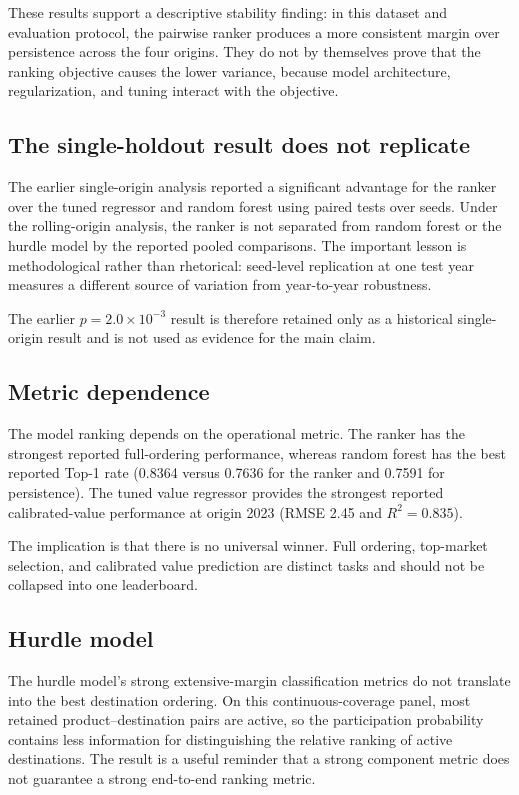 \documentclass[conference]{IEEEtran}
\begin{document}
These results support a descriptive stability finding: in this dataset and evaluation protocol, the pairwise ranker produces a more consistent margin over persistence across the four origins. They do not by themselves prove that the ranking objective causes the lower variance, because model architecture, regularization, and tuning interact with the objective.

\subsection{The single-holdout result does not replicate}

The earlier single-origin analysis reported a significant advantage for the ranker over the tuned regressor and random forest using paired tests over seeds. Under the rolling-origin analysis, the ranker is not separated from random forest or the hurdle model by the reported pooled comparisons. The important lesson is methodological rather than rhetorical: seed-level replication at one test year measures a different source of variation from year-to-year robustness.

The earlier $p=2.0\times10^{-3}$ result is therefore retained only as a historical single-origin result and is not used as evidence for the main claim.

\subsection{Metric dependence}

The model ranking depends on the operational metric. The ranker has the strongest reported full-ordering performance, whereas random forest has the best reported Top-1 rate (0.8364 versus 0.7636 for the ranker and 0.7591 for persistence). The tuned value regressor provides the strongest reported calibrated-value performance at origin 2023 (RMSE 2.45 and $R^2=0.835$).

The implication is that there is no universal winner. Full ordering, top-market selection, and calibrated value prediction are distinct tasks and should not be collapsed into one leaderboard.

\subsection{Hurdle model}

The hurdle model's strong extensive-margin classification metrics do not translate into the best destination ordering. On this continuous-coverage panel, most retained product--destination pairs are active, so the participation probability contains less information for distinguishing the relative ranking of active destinations. The result is a useful reminder that a strong component metric does not guarantee a strong end-to-end ranking metric.
\end{document}
